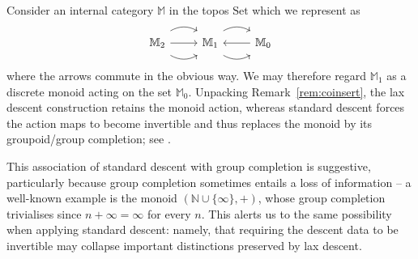 \documentclass[a4paper, 11pt,reqno]{amsart}
\newcommand{\Set}{\mathrm{Set}}
\begin{document}
\begin{discussion}\label{dis:GroupoidReflection} Consider an internal category $\mathbb{M}$ in the topos $\Set$ which we represent as %
	\begin{equation}\label{eq:groupCOMPex}
	\begin{tikzcd} \mathbb{M}_2\ar[r, bend right, shift right=1ex] \ar[r] \ar[r,bend left, shift left=1ex]&  \mathbb{M}_1 \ar[r, bend right,shift right=1ex] \ar[r, bend left, shift left=1ex] & \mathbb{M}_0 \ar[l] \end{tikzcd}
	\end{equation}	
	where the arrows commute in the obvious way. We may therefore regard $\mathbb{M}_1$ as a discrete monoid acting on the set $\mathbb{M}_0$. Unpacking Remark~\ref{rem:coinsert}, the lax descent construction retains the monoid action, whereas standard descent forces the action maps to become invertible and thus replaces the monoid by its groupoid/group completion; see \cite[Example B3.4.14]{Elephant}. 
	
	This association of standard descent with group completion is suggestive, particularly because group completion sometimes entails a loss of information -- a well-known example is the monoid $\left(\mathbb{N}\cup\{\infty\},+\right)$, whose group completion trivialises since $n+\infty=\infty$ for every $n$.
	This alerts us to the same possibility when applying standard descent: namely, that requiring the descent data to be invertible may collapse important distinctions preserved by lax descent. 
	
	
\end{discussion}
\end{document}
